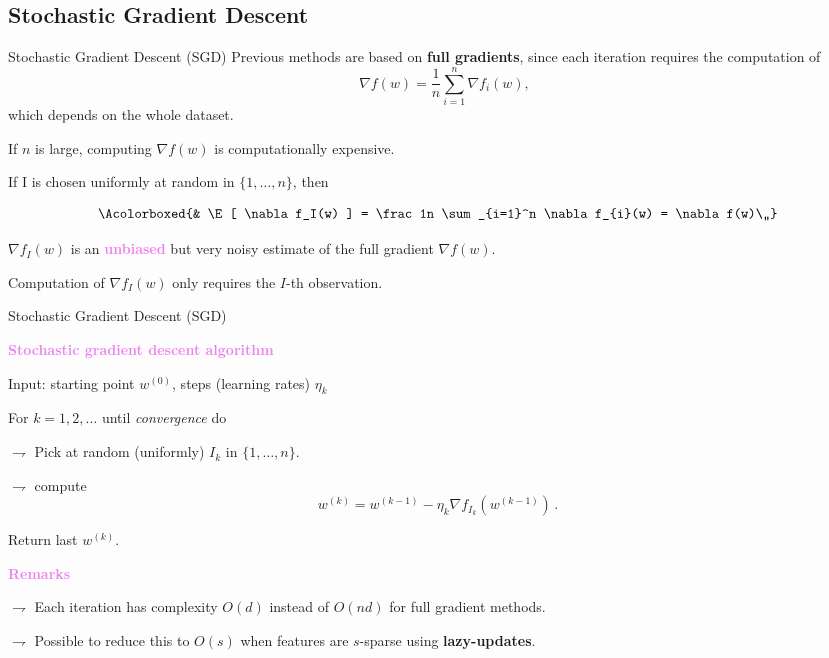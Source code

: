\documentclass[xcolor={usenames,dvipsnames}]{beamer}
\begin{document}
\subsection{Stochastic Gradient Descent}

\begin{frame}{Stochastic Gradient Descent (SGD)}
Previous methods are based on \textbf{\alert{full gradients}}, since each iteration requires the computation of
	\begin{equation*}
		\quad \nabla f(w) = \frac 1n \sum_{i=1}^n \nabla  f_i(w),
	\end{equation*}
	which depends on the whole dataset.
	
	\bigskip
	
	If \alert{$n$ is large, computing $\nabla f(w)$ is computationally expensive}.
	
	\bigskip

If I is  chosen uniformly at random in $\{ 1, \ldots, n \}$, then

\begin{align*}
\Acolorboxed{&
\E[ \nabla f_I(w) ] =
\frac 1n \sum_{i=1}^n \nabla f_{i}(w) = \nabla f(w)\,,}
\end{align*}

\vspace{.2cm}

$\nabla f_I(w)$ is an \textbf{\textcolor{violet}{unbiased}} but very noisy estimate of the full gradient $\nabla f(w)$.

\bigskip

Computation of $\nabla f_I(w)$ only requires the $I$-th observation.

\end{frame}



\begin{frame}{Stochastic Gradient Descent (SGD)}


\textbf{\textcolor{violet}{Stochastic gradient descent algorithm}}

\alert{Input}: starting point $w^{(0)}$, steps (learning rates) $\eta_k$

For $k = 1, 2, \ldots$ until \emph{convergence} do

$\rightharpoondown$ Pick at random (uniformly) $I_k$ in $\{ 1, \ldots, n \}$.

$\rightharpoondown$ compute
\begin{equation*}
w^{(k)} = w^{(k-1)} - \eta_k \nabla f_{I_k}(w^{(k-1)})\,.
\end{equation*}

\alert{Return} last $w^{(k)}$.


\vspace{.3cm}

\textbf{\textcolor{violet}{Remarks}}

$\rightharpoondown$ Each iteration \alert{has complexity $O(d)$ instead of
$O(nd)$ for full gradient methods}.

$\rightharpoondown$ Possible to reduce this to $O(s)$ when features are $s$-sparse
using \textbf{lazy-updates}.

\end{frame}
\end{document}
